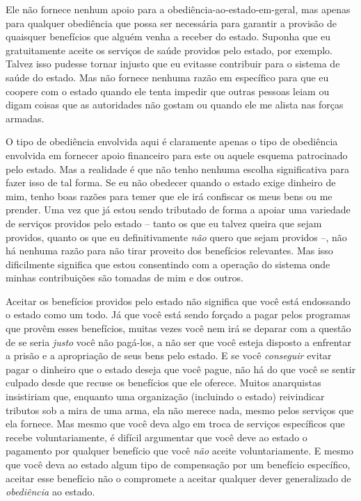 Ele não fornece nenhum apoio para a obediência-ao-estado-em-geral, mas apenas para qualquer obediência que possa ser necessária para garantir a provisão de quaisquer benefícios que alguém venha a receber do estado. Suponha que eu gratuitamente aceite os serviços de saúde providos pelo estado, por exemplo. Talvez isso pudesse tornar injusto que eu evitasse contribuir para o sistema de saúde do estado. Mas não fornece nenhuma razão em específico para que eu coopere com o estado quando ele tenta impedir que outras pessoas leiam ou digam coisas que as autoridades não gostam ou quando ele me alista nas forças armadas.

O tipo de obediência envolvida aqui é claramente apenas o tipo de obediência envolvida em fornecer apoio financeiro para este ou aquele esquema patrocinado pelo estado. Mas a realidade é que não tenho nenhuma escolha significativa para fazer isso de tal forma. Se eu não obedecer quando o estado exige dinheiro de mim, tenho boas razões para temer que ele irá confiscar os meus bens ou me prender. Uma vez que já estou sendo tributado de forma a apoiar uma variedade de serviços providos pelo estado -- tanto os que eu talvez queira que sejam providos, quanto os que eu definitivamente \emph{não} quero que sejam providos --, não há nenhuma razão para não tirar proveito dos benefícios relevantes. Mas isso dificilmente significa que estou consentindo com a operação do sistema onde minhas contribuições são tomadas de mim e dos outros.

Aceitar os benefícios providos pelo estado não significa que você está endossando o estado como um todo. Já que você está sendo forçado a pagar pelos programas que provêm esses benefícios, muitas vezes você nem irá se deparar com a questão de se seria \emph{justo} você não pagá-los, a não ser que você esteja disposto a enfrentar a prisão e a apropriação de seus bens pelo estado. E se você \emph{conseguir} evitar pagar o dinheiro que o estado deseja que você pague, não há do que você se sentir culpado desde que recuse os benefícios que ele oferece. Muitos anarquistas insistiriam que, enquanto uma organização (incluindo o estado) reivindicar tributos sob a mira de uma arma, ela não merece nada, mesmo pelos serviços que ela fornece. Mas mesmo que você deva algo em troca de serviços específicos que recebe voluntariamente, é difícil argumentar que você deve ao estado o pagamento por qualquer benefício que você \emph{não} aceite voluntariamente. E mesmo que você deva ao estado algum tipo de compensação por um benefício específico, aceitar esse benefício não o compromete a aceitar qualquer dever generalizado de \emph{obediência} ao estado.

